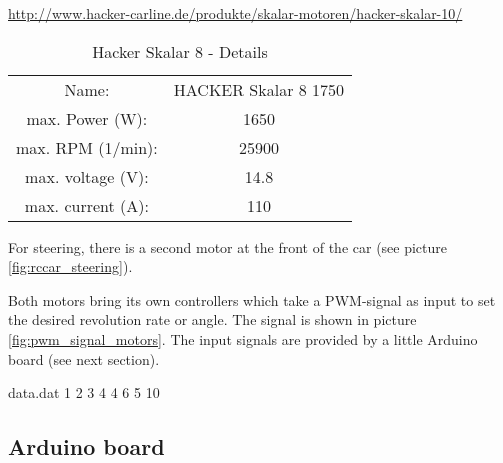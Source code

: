 \hyperref[http://www.hacker-carline.de/produkte/skalar-motoren/hacker-skalar-10/]{http://www.hacker-carline.de/produkte/skalar-motoren/hacker-skalar-10/}

\begin{table}[b]
	\centering	
	\begin{tabular}{cc} %
		\hline 
		Name: & HACKER Skalar 8 1750 \\
		max. Power (W): & 1650 \\
		max. RPM (1/min): & 25900 \\
		max. voltage (V): & 14.8 \\
		max. current (A): & 110 \\
		\hline
	\end{tabular}
	\caption{Hacker Skalar 8 - Details} %
	\label{tab:motor_details}
\end{table}


For steering, there is a second motor at the front of the car (see picture \ref{fig:rccar_steering}).

Both motors bring its own controllers which take a PWM-signal as input to set the desired revolution rate or angle. The signal is shown in picture \ref{fig:pwm_signal_motors}. The input signals are provided by a little Arduino board (see next section).

\begin{filecontents*}{data.dat}
 1  2 
3 4 
4 6 
5 10
\end{filecontents*}
 

\begin{center}
\end{center}


\subsection{Arduino board}
\label{sec:overview_arduino}

